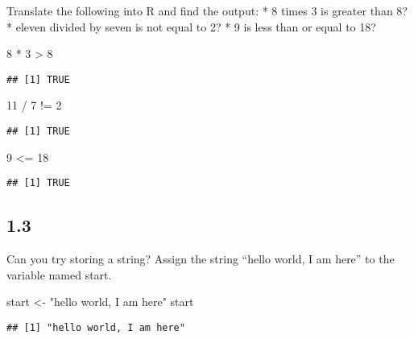 \documentclass[
]{book}
\newenvironment{Shaded}{\begin{snugshade}}{\end{snugshade}}
\newcommand{\DecValTok}[1]{\textcolor[rgb]{0.00,0.00,0.81}{#1}}
\newcommand{\NormalTok}[1]{#1}
\newcommand{\OtherTok}[1]{\textcolor[rgb]{0.56,0.35,0.01}{#1}}
\newcommand{\SpecialCharTok}[1]{\textcolor[rgb]{0.00,0.00,0.00}{#1}}
\newcommand{\StringTok}[1]{\textcolor[rgb]{0.31,0.60,0.02}{#1}}
\begin{document}
Translate the following into R and find the output:
* 8 times 3 is greater than 8?
* eleven divided by seven is not equal to 2?
* 9 is less than or equal to 18?

\begin{Shaded}
\begin{Highlighting}[]
\DecValTok{8} \SpecialCharTok{*} \DecValTok{3} \SpecialCharTok{\textgreater{}} \DecValTok{8}
\end{Highlighting}
\end{Shaded}

\begin{verbatim}
## [1] TRUE
\end{verbatim}

\begin{Shaded}
\begin{Highlighting}[]
\DecValTok{11} \SpecialCharTok{/} \DecValTok{7} \SpecialCharTok{!=} \DecValTok{2}
\end{Highlighting}
\end{Shaded}

\begin{verbatim}
## [1] TRUE
\end{verbatim}

\begin{Shaded}
\begin{Highlighting}[]
\DecValTok{9} \SpecialCharTok{\textless{}=} \DecValTok{18}
\end{Highlighting}
\end{Shaded}

\begin{verbatim}
## [1] TRUE
\end{verbatim}

\hypertarget{section-2}{%
\subsection{1.3}\label{section-2}}

Can you try storing a string? Assign the string ``hello world, I am here'' to the variable named start.

\begin{Shaded}
\begin{Highlighting}[]
\NormalTok{start }\OtherTok{\textless{}{-}} \StringTok{"hello world, I am here"}
\NormalTok{start}
\end{Highlighting}
\end{Shaded}

\begin{verbatim}
## [1] "hello world, I am here"
\end{verbatim}
\end{document}
